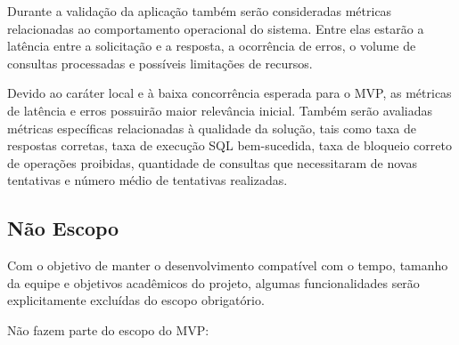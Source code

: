 Durante a validação da aplicação também serão consideradas métricas relacionadas ao comportamento operacional do sistema. Entre elas estarão a latência entre a solicitação e a resposta, a ocorrência de erros, o volume de consultas processadas e possíveis limitações de recursos.

Devido ao caráter local e à baixa concorrência esperada para o MVP, as métricas de latência e erros possuirão maior relevância inicial. Também serão avaliadas métricas específicas relacionadas à qualidade da solução, tais como taxa de respostas corretas, taxa de execução SQL bem-sucedida, taxa de bloqueio correto de operações proibidas, quantidade de consultas que necessitaram de novas tentativas e número médio de tentativas realizadas.


\subsection{Não Escopo}

Com o objetivo de manter o desenvolvimento compatível com o tempo, tamanho da equipe e objetivos acadêmicos do projeto, algumas funcionalidades serão explicitamente excluídas do escopo obrigatório.

Não fazem parte do escopo do MVP:

